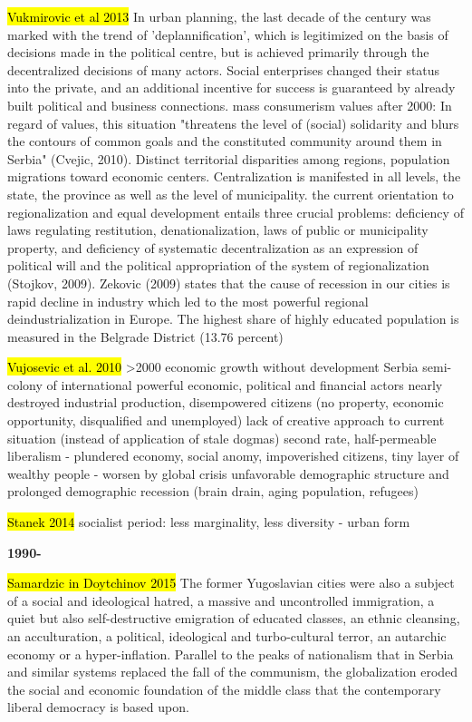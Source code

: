 \documentclass[11pt]{report}
\begin{document}
\hl{Vukmirovic et al 2013}
In urban planning, the last decade of the century was marked with the trend of 'deplannification', which is legitimized on the basis of decisions made in the political centre, but is achieved primarily through the decentralized decisions of many actors. 
Social enterprises changed their status into the private, and an additional incentive for success is guaranteed by already built political and business connections. 
mass consumerism values after  2000: In regard of values, this situation "threatens the level of (social) solidarity and blurs the contours of common goals and the constituted community around them in Serbia" (Cvejic,  2010).
Distinct territorial disparities among regions, population migrations toward economic centers. Centralization is manifested in all levels, the state, the province as well as the level of municipality.
the current orientation to regionalization and equal development entails three crucial problems: deficiency of laws regulating restitution, denationalization, laws of public or municipality property, and deficiency of systematic decentralization as an expression of political will and the political appropriation of the system of regionalization (Stojkov, 2009).
Zekovic (2009) states that the cause of recession in our cities is rapid decline in industry which led to the most powerful regional deindustrialization in Europe.
The highest share of highly educated population is measured in the Belgrade District (13.76 percent) 

\hl{Vujosevic et al. 2010}
>2000 economic growth without development
Serbia semi-colony of international powerful economic, political and financial actors
nearly destroyed industrial production, disempowered citizens (no property, economic opportunity, disqualified and unemployed)
lack of creative approach to current situation (instead of application of stale dogmas)
second rate, half-permeable liberalism - plundered economy, social anomy, impoverished citizens, tiny layer of wealthy people - worsen by global crisis
unfavorable demographic structure and prolonged demographic recession (brain drain, aging population, refugees)

\hl{Stanek 2014}
socialist period: less marginality, less diversity - urban form

\textbf{1990-}

\hl{Samardzic in Doytchinov 2015}
	The former Yugoslavian cities  were  also  a  subject  of  a  social  and  ideological  hatred,  a  massive  and uncontrolled  immigration,  a  quiet  but  also  self-destructive  emigration of educated classes, an ethnic cleansing, an acculturation, a political, ideological and  turbo-cultural  terror,  an  autarchic  economy  or  a  hyper-inflation.
Parallel to the peaks of nationalism that in Serbia and similar
systems  replaced  the  fall  of  the  communism,  the globalization  eroded  the social  and  economic  foundation  of  the  middle  class  that  the  contemporary liberal democracy is based upon. 
	
\end{document}
